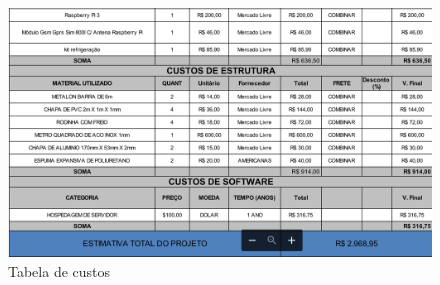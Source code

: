  \begin{figure}[H]
 	\begin{center}
 		\includegraphics[width = 15cm]{figuras/custos_2.png}
 		\caption{Tabela de custos}
 	\end{center}
 \end{figure}
